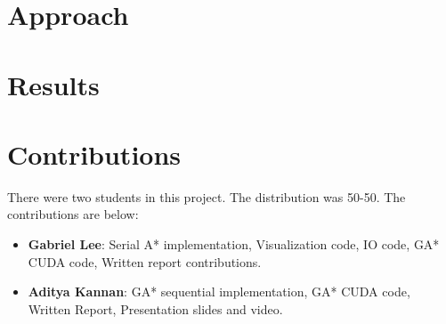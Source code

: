 \documentclass[12pt, oneside]{book}
\begin{document}
\chapter{Approach}


\chapter{Results}


\chapter{Contributions}
There were two students in this project. The distribution was 50-50. The contributions are below:

\begin{itemize}
    \item \textbf{Gabriel Lee}: Serial A* implementation, Visualization code, IO code, GA* CUDA code, Written report contributions.
    \item \textbf{Aditya Kannan}: GA* sequential implementation, GA* CUDA code, Written Report, Presentation slides and video.
\end{itemize}







\end{document}
